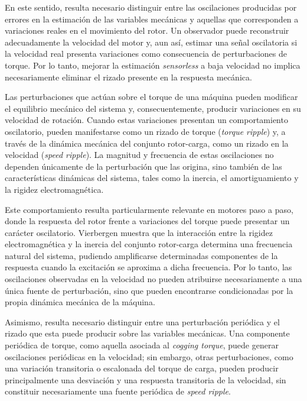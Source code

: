 En este sentido, resulta necesario distinguir entre las oscilaciones producidas por errores en la estimación de las variables mecánicas y aquellas que corresponden a variaciones reales en el movimiento del rotor. Un observador puede reconstruir adecuadamente la velocidad del motor y, aun así, estimar una señal oscilatoria si la velocidad real presenta variaciones como consecuencia de perturbaciones de torque. Por lo tanto, mejorar la estimación \textit{sensorless} a baja velocidad no implica necesariamente eliminar el rizado presente en la respuesta mecánica.

Las perturbaciones que actúan sobre el torque de una máquina pueden modificar el equilibrio mecánico del sistema y, consecuentemente, producir variaciones en su velocidad de rotación. Cuando estas variaciones presentan un comportamiento oscilatorio, pueden manifestarse como un rizado de torque (\textit{torque ripple}) y, a través de la dinámica mecánica del conjunto rotor-carga, como un rizado en la velocidad (\textit{speed ripple}). La magnitud y frecuencia de estas oscilaciones no dependen únicamente de la perturbación que las origina, sino también de las características dinámicas del sistema, tales como la inercia, el amortiguamiento y la rigidez electromagnética.

Este comportamiento resulta particularmente relevante en motores paso a paso, donde la respuesta del rotor frente a variaciones del torque puede presentar un carácter oscilatorio. Vierbergen \cite{vierbergenPredictingImprovingBehaviour} muestra que la interacción entre la rigidez electromagnética y la inercia del conjunto rotor-carga determina una frecuencia natural del sistema, pudiendo amplificarse determinadas componentes de la respuesta cuando la excitación se aproxima a dicha frecuencia. Por lo tanto, las oscilaciones observadas en la velocidad no pueden atribuirse necesariamente a una única fuente de perturbación, sino que pueden encontrarse condicionadas por la propia dinámica mecánica de la máquina.

Asimismo, resulta necesario distinguir entre una perturbación periódica y el rizado que esta puede producir sobre las variables mecánicas. Una componente periódica de torque, como aquella asociada al \textit{cogging torque}, puede generar oscilaciones periódicas en la velocidad; sin embargo, otras perturbaciones, como una variación transitoria o escalonada del torque de carga, pueden producir principalmente una desviación y una respuesta transitoria de la velocidad, sin constituir necesariamente una fuente periódica de \textit{speed ripple}.


